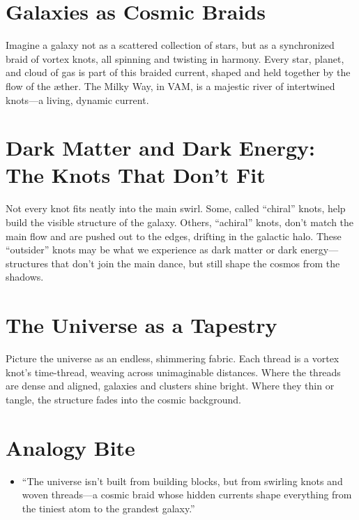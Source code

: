 \section*{Galaxies as Cosmic Braids}

Imagine a galaxy not as a scattered collection of stars, but as a synchronized braid of vortex knots, all spinning and twisting in harmony. Every star, planet, and cloud of gas is part of this braided current, shaped and held together by the flow of the æther. The Milky Way, in VAM, is a majestic river of intertwined knots—a living, dynamic current.


\section*{Dark Matter and Dark Energy: The Knots That Don’t Fit}

Not every knot fits neatly into the main swirl. Some, called “chiral” knots, help build the visible structure of the galaxy. Others, “achiral” knots, don’t match the main flow and are pushed out to the edges, drifting in the galactic halo. These “outsider” knots may be what we experience as dark matter or dark energy—structures that don’t join the main dance, but still shape the cosmos from the shadows.


\section*{The Universe as a Tapestry}

Picture the universe as an endless, shimmering fabric. Each thread is a vortex knot’s time-thread, weaving across unimaginable distances. Where the threads are dense and aligned, galaxies and clusters shine bright. Where they thin or tangle, the structure fades into the cosmic background.


\section*{Analogy Bite}

\begin{itemize}

\item
“The universe isn’t built from building blocks, but from swirling knots and woven threads—a cosmic braid whose hidden currents shape everything from the tiniest atom to the grandest galaxy.”




\end{itemize}
